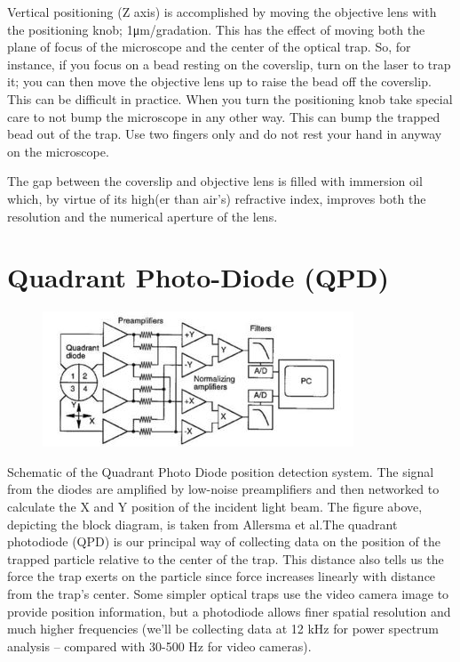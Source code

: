 \documentclass{../lab}
\begin{document}
Vertical positioning (Z axis) is accomplished by moving the objective lens with the positioning knob; 1μm/gradation. This has the effect of moving both the plane of focus of the microscope and the center of the optical trap. So, for instance, if you focus on a bead resting on the coverslip, turn on the laser to trap it; you can then move the objective lens up to raise the bead off the coverslip. This can be difficult in practice. When you turn the positioning knob take special care to not bump the microscope in any other way. This can bump the trapped bead out of the trap. Use two fingers only and do not rest your hand in anyway on the microscope.

The gap between the coverslip and objective lens is filled with immersion oil which, by virtue of its high(er than air's) refractive index, improves both the resolution and the numerical aperture of the lens.

\section{Quadrant Photo-Diode (QPD)}

\begin{figure}[h]
    \centering
    \href{http://experimentationlab.berkeley.edu/sites/default/files/images/350px-QPD2.jpg}{\includegraphics[width=0.5\linewidth]{images/350px-QPD2.jpg}}
    \caption{}
    \label{fig:350px-QPD2}
\end{figure}


Schematic of the Quadrant Photo Diode position detection system. The signal from the diodes are amplified by low-noise preamplifiers and then networked to calculate the X and Y position of the incident light beam. The figure above, depicting the block diagram, is taken from  Allersma et al.The quadrant photodiode (QPD) is our principal way of collecting data on the position of the trapped particle relative to the center of the trap. This distance also tells us the force the trap exerts on the particle since force increases linearly with distance from the trap's center. Some simpler optical traps use the video camera image to provide position information, but a photodiode allows finer spatial resolution and much higher frequencies (we'll be collecting data at 12 kHz for power spectrum analysis -- compared with 30-500 Hz for video cameras).
\end{document}
